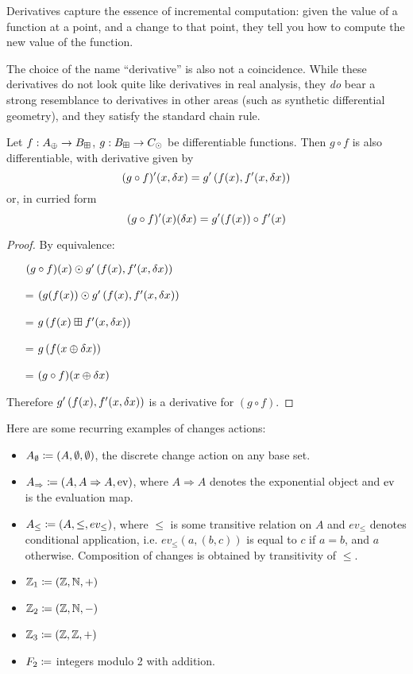Derivatives capture the essence of incremental computation: given the value of a
function at a point, and a change to that point, they tell you how to compute
the new value of the function.

The choice of the name ``derivative'' is also not a coincidence. While these
derivatives do not look quite like derivatives in real analysis, they \emph{do}
bear a strong resemblance to derivatives in other areas (such as synthetic differential geometry), and
they satisfy the standard chain rule.

\begin{thm}
  Let $f: A_\oplus \rightarrow B_\boxplus$, $g: B_\boxplus \rightarrow C_\odot$ be differentiable functions. Then $g \circ f$ is also
  differentiable, with derivative given by
   $$(g \circ f)'(x, \delta x) = g'\left(f(x), f'(x, \delta x)\right)$$
   or, in curried form
   $$(g \circ f)'(x)(\delta x) = g'(f(x)) \circ f'(x)$$
\end{thm}
\begin{proof}
  By equivalence:
  \begin{itemize}
    \item[ ]$(g \circ f)(x) \odot g'\left(f(x), f'(x,\delta x)\right)$
    \item[=]$(g(f(x)) \odot g'\left(f(x), f'(x,\delta x)\right)$
    \item[=]$g\left(f(x) \boxplus f'(x, \delta x) \right)$
    \item[=]$g\left(f(x \oplus \delta x)\right)$
    \item[=]$(g \circ f)(x \oplus \delta x)$
  \end{itemize}
  Therefore $g'\left(f(x), f'(x, \delta x)\right)$ is a
  derivative for $(g \circ f)$.
\end{proof}

Here are some recurring examples of changes actions:
\begin{itemize}
  \item $A_\emptyset \coloneqq (A,\emptyset,\emptyset)$, the discrete change action on any base set.
  \item $A_\Rightarrow \coloneqq (A,A\Rightarrow A,\operatorname{ev})$, where $A
    \Rightarrow A$ denotes the exponential object and $\operatorname{ev}$ is the evaluation map.
  \item $A_\leq \coloneqq (A,\leq,ev_\leq)$, where $\leq$ is some
    transitive relation on $A$ and $ev_\leq$ denotes
    conditional application, i.e. $ev_\leq(a, (b, c))$ is equal to $c$ if $a = b$, and $a$ otherwise. Composition of changes is obtained
    by transitivity of $\leq$.
  \item $\mathbb{Z}_1 \coloneqq (\mathbb{Z},\mathbb{N},+)$
  \item $\mathbb{Z}_2 \coloneqq (\mathbb{Z},\mathbb{N},-)$
  \item $\mathbb{Z}_3 \coloneqq (\mathbb{Z},\mathbb{Z},+)$
  \item $F_2 \coloneqq$ integers modulo 2 with addition.
\end{itemize}

